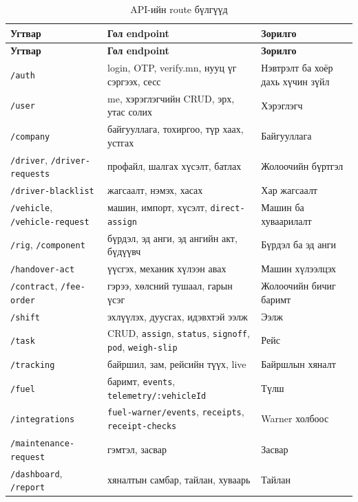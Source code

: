 \documentclass[
12pt,
oneside,
english,
onehalfspacing,
nolistspacing,
headsepline,
]{MUST-Thesis}
\begin{document}
{\small
\renewcommand{\arraystretch}{1.15}
\begin{longtable}{|L{3.8cm}|L{4.6cm}|L{5.4cm}|}
\caption{API-ийн route бүлгүүд}\label{tab:app-routes}\\
\hline
{}\textbf{Угтвар} & \textbf{Гол endpoint} & \textbf{Зорилго} \\ \hline
\endfirsthead
\hline
{}\textbf{Угтвар} & \textbf{Гол endpoint} & \textbf{Зорилго} \\ \hline
\endhead
\texttt{/auth} & login, OTP, verify.mn, нууц үг сэргээх, сесс & Нэвтрэлт ба хоёр дахь хүчин зүйл \\ \hline
\texttt{/user} & me, хэрэглэгчийн CRUD, эрх, утас солих & Хэрэглэгч \\ \hline
\texttt{/company} & байгууллага, тохиргоо, түр хаах, устгах & Байгууллага \\ \hline
\texttt{/driver}, \texttt{/driver-requests} & профайл, шалгах хүсэлт, батлах & Жолоочийн бүртгэл \\ \hline
\texttt{/driver-blacklist} & жагсаалт, нэмэх, хасах & Хар жагсаалт \\ \hline
\texttt{/vehicle}, \texttt{/vehicle-request} & машин, импорт, хүсэлт, \texttt{direct-assign} & Машин ба хуваарилалт \\ \hline
\texttt{/rig}, \texttt{/component} & бүрдэл, эд анги, эд ангийн акт, бүдүүвч & Бүрдэл ба эд анги \\ \hline
\texttt{/handover-act} & үүсгэх, механик хүлээн авах & Машин хүлээлцэх \\ \hline
\texttt{/contract}, \texttt{/fee-order} & гэрээ, хөлсний тушаал, гарын үсэг & Жолоочийн бичиг баримт \\ \hline
\texttt{/shift} & эхлүүлэх, дуусгах, идэвхтэй ээлж & Ээлж \\ \hline
\texttt{/task} & CRUD, \texttt{assign}, \texttt{status}, \texttt{signoff}, \texttt{pod}, \texttt{weigh-slip} & Рейс \\ \hline
\texttt{/tracking} & байршил, зам, рейсийн түүх, live & Байршлын хяналт \\ \hline
\texttt{/fuel} & баримт, \texttt{events}, \texttt{telemetry/:vehicleId} & Түлш \\ \hline
\texttt{/integrations} & \texttt{fuel-warner/events}, \texttt{receipts}, \texttt{receipt-checks} & Warner холбоос \\ \hline
\texttt{/maintenance-request} & гэмтэл, засвар & Засвар \\ \hline
\texttt{/dashboard}, \texttt{/report} & хяналтын самбар, тайлан, хуваарь & Тайлан \\ \hline

\end{longtable}}
\end{document}
